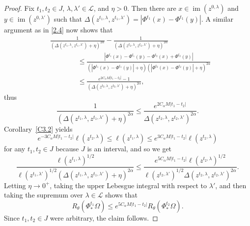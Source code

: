 \documentclass[reqno,centertags,12pt]{amsart}
\theoremstyle{definition}
\numberwithin{equation}{section}
\newcommand{\abs}[1]{\left\lvert#1\right\rvert}
\newcommand{\calL}{{\mathcal L}}
\newcommand{\tht}{\theta}
\begin{document}
\begin{proof}
    Fix $t_{1},t_{2}\in J$, $\lambda,\lambda'\in\mathcal{L}$, and $\eta>0$.
    Then there are $x\in\operatorname{im}(z^{0,\lambda})$ and
    $y\in\operatorname{im}(z^{0,\lambda'})$ such that
    $\Delta(z^{t_{1},\lambda},z^{t_{1},\lambda'}) = \abs{\Phi^{t_{1}}(x) - \Phi^{t_{1}}(y)}$.
    A similar argument as in \eqref{2.4} now shows that
    \begin{align*}
        &\frac{1}{\left(
            \Delta(z^{t_{1},\lambda},z^{t_{1},\lambda'}) + \eta
        \right)^{2\alpha}}
        - \frac{1}{\left(
            \Delta(z^{t_{2},\lambda},z^{t_{2},\lambda'}) + \eta
        \right)^{2\alpha}}
        \\&\quad\quad\quad\quad
        \leq \frac{\abs{\Phi^{t_{1}}(x) - \Phi^{t_{1}}(y)
        - \Phi^{t_{2}}(x) + \Phi^{t_{2}}(y)}}
        {\left(\abs{\Phi^{t_{1}}(x) - \Phi^{t_{1}}(y)} + \eta\right)
        \left(\abs{\Phi^{t_{2}}(x) - \Phi^{t_{2}}(y)} + \eta\right)^{2\alpha}}
        \\&\quad\quad\quad\quad
        \leq \frac{e^{2C_{\alpha}M\abs{t_{1} - t_{2}}} - 1}
        {(\Delta(z^{t_{2},\lambda},z^{t_{2},\lambda'}) + \eta)^{2\alpha}},
    \end{align*}
    thus
    \begin{equation}\label{3.7}
        \frac{1}{\left(
            \Delta(z^{t_{1},\lambda},z^{t_{1},\lambda'}) + \eta
        \right)^{2\alpha}}
        \leq \frac{e^{2C_{\alpha}M\abs{t_{1} - t_{2}}}}
        {\Delta(z^{t_{2},\lambda},z^{t_{2},\lambda'})^{2\alpha}}.
    \end{equation}
    Corollary~\ref{C3.2} yields
    \[
        e^{-3C_{\alpha}M\abs{t_{1} - t_{2}}}\ell(z^{t_{2},\lambda})
        \leq \ell(z^{t_{1},\lambda}) \leq
        e^{3C_{\alpha}M\abs{t_{1} - t_{2}}}\ell(z^{t_{2},\lambda})
    \]
    for any $t_{1},t_{2}\in J$ because $J$ is an interval, and so we get
    \begin{equation}\label{3.8}
        \frac{\ell(z^{t_{1},\lambda})^{1/2}}
        {\ell(z^{t_{1},\lambda'})^{1/2}\left(
            \Delta(z^{t_{1},\lambda},z^{t_{1},\lambda'}) + \eta
        \right)^{2\alpha}}
        \leq \frac{e^{5C_{\alpha}M\abs{t_{1} - t_{2}}}\ell(z^{t_{2},\lambda})^{1/2}}
        {\ell(z^{t_{2},\lambda'})^{1/2}
        \Delta(z^{t_{2},\lambda},z^{t_{2},\lambda'})^{2\alpha}}.
    \end{equation}
    Letting $\eta\to 0^{+}$, taking the upper Lebesgue integral with respect to $\lambda'$,
    and then taking the supremum over $\lambda\in\calL$ shows that
    \begin{equation}\label{3.9}
        R_{\tht}(\Phi_{*}^{t_{1}}\Omega)
        \leq e^{5C_{\alpha}M\abs{t_{1} - t_{2}}}R_{\tht}(\Phi_{*}^{t_{2}}\Omega).
    \end{equation}
    Since $t_{1},t_{2}\in J$ were arbitrary, the claim follows.
\end{proof}
\end{document}
